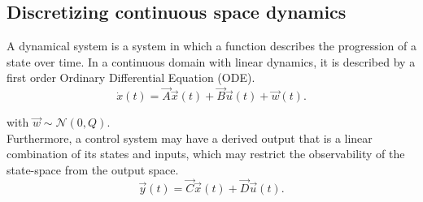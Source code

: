 \documentclass[runningheads,a4paper]{llncs}
\begin{document}
\subsection{Discretizing continuous space dynamics}

A dynamical system is a system in which a function describes the progression of a state over time. 
In a continuous domain with linear dynamics, it is described by a first order Ordinary Differential Equation (ODE).
\begin{equation}
\dot{x}(t)=\vec{A}\vec{x}(t)+\vec{B}\vec{u}(t) +\vec{w}(t).
\label{eq:dynamical}
\end{equation}

\noindent with $\vec{w} \sim \mathcal{N}(0,Q)$.\\
Furthermore, a control system may have a derived output that is a linear combination of its states and inputs, 
which may restrict the observability of the state-space from the output space.
\begin{equation}
\vec{y}(t)=\vec{C}\vec{x}(t)+\vec{D}\vec{u}(t).
\end{equation}
\end{document}
